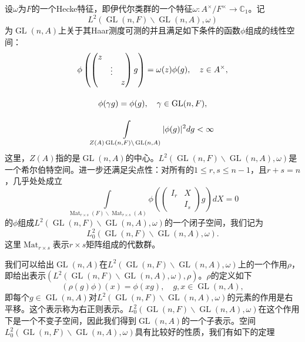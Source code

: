 设$\omega$为$F$的一个Hecke特征，即伊代尔类群的一个特征$\omega: A^\times / F^\times \rightarrow \mathbb{C}_1$。记
$$L^2\left( \operatorname{GL}(n,F)\backslash \operatorname{GL}(n,A), \omega \right)$$
为$\operatorname{GL}(n, A)$上关于其Haar测度\cite{ramakrishnan2005fourier}可测的并且满足如下条件的函数$\phi$组成的线性空间：
\begin{gather}
\label{eq:lin_sp1}
\phi \left( \begin{pmatrix} z & & \\ & \vdots & \\ & & z \end{pmatrix} g \right) = \omega(z)\phi(g), \quad z\in A^\times, \\[1em]
\label{eq:lin_sp2}
\phi(\gamma g) = \phi(g), \quad \gamma \in \operatorname{GL}(n,F), \\[1em]
\int\limits_{Z(A)\operatorname{GL}(n,F)\backslash \operatorname{GL}(n,A)} \lvert \phi(g) \rvert^2 dg < \infty \notag
\end{gather}
这里，$Z(A)$指的是$\operatorname{GL}(n, A)$的中心。$L^2\left( \operatorname{GL}(n,F)\backslash \operatorname{GL}(n,A), \omega \right)$是一个希尔伯特空间。进一步还满足尖点性：对所有的$1 \leqslant r,s \leqslant n-1$，且$r+s=n$，几乎处处成立
\begin{equation}
\label{eq:cusp_cond}
\int\limits_{\operatorname{Mat}_{r\times s}(F) \backslash \operatorname{Mat}_{r\times s}(A)} \phi \left( \begin{pmatrix} I_r & X \\ & I_s \end{pmatrix} g \right) dX = 0
\end{equation}
的$\phi$组成$L^2\left( \operatorname{GL}(n,F)\backslash \operatorname{GL}(n,A), \omega \right)$的一个闭子空间，我们记为
$$L^2_0\left( \operatorname{GL}(n,F)\backslash \operatorname{GL}(n,A), \omega \right).$$
这里$\operatorname{Mat}_{r\times s}$表示$r\times s$矩阵组成的代数群。

我们可以给出$\operatorname{GL}(n,A)$在$L^2\left( \operatorname{GL}(n,F)\backslash \operatorname{GL}(n,A), \omega \right)$上的一个作用$\rho$，即给出表示$\left( L^2\left( \operatorname{GL}(n,F)\backslash \operatorname{GL}(n,A), \omega \right), \rho \right)$。$\rho$的定义如下
$$
(\rho(g)\phi)(x) = \phi(xg), \quad g,x \in \operatorname{GL}(n,A),
$$
即每个$g\in \operatorname{GL}(n,A)$对$L^2\left( \operatorname{GL}(n,F)\backslash \operatorname{GL}(n,A), \omega \right)$的元素的作用是右平移。这个表示称为右正则表示。$L^2_0\left( \operatorname{GL}(n,F)\backslash \operatorname{GL}(n,A), \omega \right)$在这个作用下是一个不变子空间，因此我们得到$\operatorname{GL}(n,A)$的一个子表示。空间$L^2_0\left( \operatorname{GL}(n,F)\backslash \operatorname{GL}(n,A), \omega \right)$具有比较好的性质，我们有如下的定理

